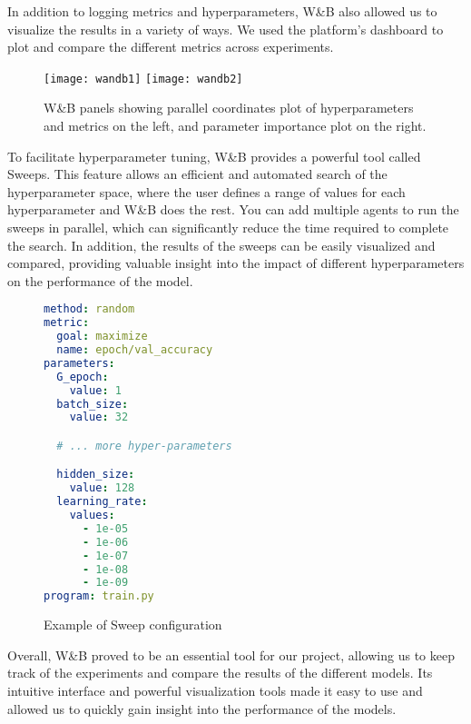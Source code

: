 In addition to logging metrics and hyperparameters, W\&B also allowed us to visualize the results in a variety of ways. 
We used the platform's dashboard to plot and compare the different metrics across experiments.

\begin{figure}[H]
  \centering
  \texttt{[image: wandb1]}
  \texttt{[image: wandb2]}
  \caption{W\&B panels showing parallel coordinates plot of hyperparameters and metrics on the left, and parameter importance plot on the right.}
\end{figure}


To facilitate hyperparameter tuning, W\&B provides a powerful tool called Sweeps.
This feature allows an efficient and automated search of the hyperparameter space, where the user defines a range of values for each hyperparameter and W\&B does the rest.
You can add multiple agents to run the sweeps in parallel, which can significantly reduce the time required to complete the search.
In addition, the results of the sweeps can be easily visualized and compared, providing valuable insight into the impact of different hyperparameters on the performance of the model.

\begin{figure}[H]
\begin{lstlisting}[language=yaml]
method: random
metric:
  goal: maximize
  name: epoch/val_accuracy
parameters:
  G_epoch:
    value: 1
  batch_size:
    value: 32

  # ... more hyper-parameters

  hidden_size:
    value: 128
  learning_rate:
    values:
      - 1e-05
      - 1e-06
      - 1e-07
      - 1e-08
      - 1e-09
program: train.py
\end{lstlisting}
\caption{Example of Sweep configuration}
\end{figure}

Overall, W\&B proved to be an essential tool for our project, allowing us to keep track of the experiments and compare the results of the different models. 
Its intuitive interface and powerful visualization tools made it easy to use and allowed us to quickly gain insight into the performance of the models.





